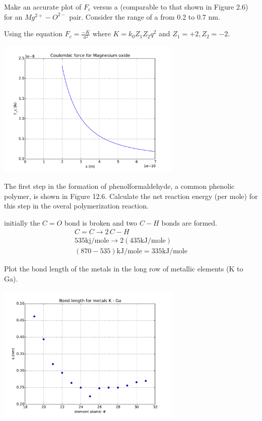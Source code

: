 \documentclass[12pt]{article}
\newenvironment{problem}[2][Problem]{\begin{trivlist}
\item[\hskip \labelsep {\bfseries #1}\hskip \labelsep {\bfseries #2.}]}{\end{trivlist}}
\begin{document}
\begin{problem}{2.13}
Make an accurate plot of $F_c$ versus a (comparable to that shown in Figure 2.6) for an $Mg^{2+} -O^{2-}$ pair. Consider the range of a from 0.2 to 0.7 nm.
\end{problem}

Using the equation $F_c = \frac{-K}{a^2}$ where $K = k_0Z_1Z_2q^2$ and $Z_1 = +2, Z_2 = -2.$
\begin{center}
\includegraphics[width=250pt]{graph_p2_13.pdf}
\end{center}

\begin{problem}{2.33}
The first step in the formation of phenolformaldehyde, a common phenolic polymer, is shown in Figure 12.6. Calculate the net reaction energy (per mole) for this step in the overal polymerization reaction.
\end{problem}

initially the $C = O$ bond is broken and two $C - H$ bonds are formed.
\begin{align*}
C = C \rightarrow 2\,C-H \\
535 \text{kj/mole} \rightarrow 2(435 \text{kJ/mole}) \\
(870 - 535) \text{kJ/mole} = 335 \text{kJ/mole}
\end{align*}

\begin{problem}{2.46}
Plot the bond length of the metals in the long row of metallic elements (K to Ga).
\end{problem}

\begin{center}
\includegraphics[width=250pt]{graph_p2_46.pdf}
\end{center}
\end{document}
